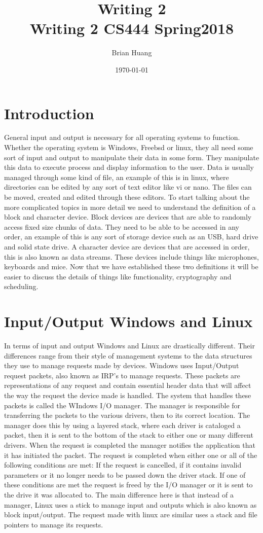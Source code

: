 \documentclass[onecolumn, draftclsnofoot, 10pt, titlepage, compsoc]{IEEEtran}
\title
{%
	Writing 2 \\
	\vspace{0.4cm}
	\large Writing 2
	\vspace{0.4cm}
	\large CS444 Spring2018
}
\author{Brian Huang}
\date{\today}
\begin{document}
\maketitle

\section{Introduction}
General input and output is necessary for all operating systems to function. Whether the operating system is Windows, Freebsd or linux, they all need some sort of input and output to manipulate their data in some form. They manipulate this data to execute process and display information to the user. Data is usually managed through some kind of file, an example of this is in linux, where directories can be edited by any sort of text editor like vi or nano. The files can be moved, created and edited through these editors. To start talking about the more complicated topics in more detail we need to understand the definition of a block and character device. Block devices are devices that are able to randomly access fixed size chunks of data. They need to be able to be accessed in any order, an example of this is any sort of storage device such as an USB, hard drive and solid state drive. A character device are devices that are accessed in order, this is also known as data streams. These devices include things like microphones, keyboards and mice. Now that we have established these two definitions it will be easier to discuss the details of things like functionality, cryptography and scheduling.

\section{Input/Output Windows and Linux}
In terms of input and output Windows and Linux are drastically different. Their differences range from their style of management systems to the data structures they use to manage requests made by devices. Windows uses Input/Output request packets, also known as IRP’s to manage requests. These packets are representations of any request and contain essential header data that will affect the way the request the device made is handled. The system that handles these packets is called the WIndows I/O manager. The manager is responsible for transferring the packets to the various drivers, then to its correct location. The manager does this by using a layered stack, where each driver is cataloged a packet, then it is sent to the bottom of the stack to either one or many different drivers. When the request is completed the manager notifies the application that it has initiated the packet. The request is completed when either one or all of the following conditions are met: If the request is cancelled, if it contains invalid parameters or it no longer needs to be passed down the driver stack. If one of these conditions are met the request is freed by the I/O manager or it is sent to the drive it was allocated to. The main difference here is that instead of a manager, Linux uses a stick to manage input and outputs which is also known as block input/output. The request made with linux are similar uses a stack and file pointers to manage its requests. 
\end{document}
